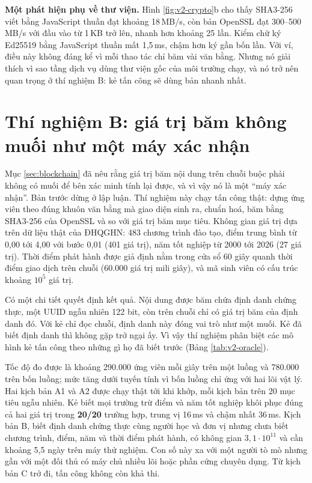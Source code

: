 \textbf{Một phát hiện phụ về thư viện.} Hình \ref{fig:v2-crypto}b cho thấy SHA3-256 viết bằng JavaScript thuần đạt khoảng 18\,MB/s, còn bản OpenSSL đạt 300--500\,MB/s với đầu vào từ 1\,KB trở lên, nhanh hơn khoảng 25 lần. Kiểm chữ ký Ed25519 bằng JavaScript thuần mất 1,5\,ms, chậm hơn ký gần bốn lần. Với ví, điều này không đáng kể vì mỗi thao tác chỉ băm vài văn bằng. Nhưng nó giải thích vì sao tầng dịch vụ dùng thư viện gốc của môi trường chạy, và nó trở nên quan trọng ở thí nghiệm B: kẻ tấn công sẽ dùng bản nhanh nhất.

\section{Thí nghiệm B: giá trị băm không muối như một máy xác nhận}
\label{sec:tn-oracle}

Mục \ref{sec:blockchain} đã nêu rằng giá trị băm nội dung trên chuỗi buộc phải không có muối để bên xác minh tính lại được, và vì vậy nó là một ``máy xác nhận''. Bản trước dừng ở lập luận. Thí nghiệm này chạy tấn công thật: dựng ứng viên theo đúng khuôn văn bằng mà giao diện sinh ra, chuẩn hoá, băm bằng SHA3-256 của OpenSSL và so với giá trị băm mục tiêu. Không gian giá trị dựa trên dữ liệu thật của ĐHQGHN: 483 chương trình đào tạo, điểm trung bình từ 0,00 tới 4,00 với bước 0,01 (401 giá trị), năm tốt nghiệp từ 2000 tới 2026 (27 giá trị). Thời điểm phát hành được giả định nằm trong cửa sổ 60 giây quanh thời điểm giao dịch trên chuỗi (60.000 giá trị mili giây), và mã sinh viên có cấu trúc khoảng $10^5$ giá trị.

Có một chi tiết quyết định kết quả. Nội dung được băm chứa định danh chứng thực, một UUID ngẫu nhiên 122 bit, còn trên chuỗi chỉ có giá trị băm của định danh đó. Với kẻ chỉ đọc chuỗi, định danh này đóng vai trò như một muối. Kẻ đã biết định danh thì không gặp trở ngại ấy. Vì vậy thí nghiệm phân biệt các mô hình kẻ tấn công theo những gì họ đã biết trước (Bảng \ref{tab:v2-oracle}).





Tốc độ đo được là khoảng 290.000 ứng viên mỗi giây trên một luồng và 780.000 trên bốn luồng; mức tăng dưới tuyến tính vì bốn luồng chỉ ứng với hai lõi vật lý. Hai kịch bản A1 và A2 được chạy thật tới khi khớp, mỗi kịch bản trên 20 mục tiêu ngẫu nhiên. Kẻ biết mọi trường trừ điểm và năm tốt nghiệp khôi phục đúng cả hai giá trị trong \textbf{20/20} trường hợp, trung vị 16\,ms và chậm nhất 36\,ms. Kịch bản B, biết định danh chứng thực cùng người học và đơn vị nhưng chưa biết chương trình, điểm, năm và thời điểm phát hành, có không gian $3{,}1 \cdot 10^{11}$ và cần khoảng 5,5 ngày trên máy thử nghiệm. Con số này xa với một người tò mò nhưng gần với một đối thủ có máy chủ nhiều lõi hoặc phần cứng chuyên dụng. Từ kịch bản C trở đi, tấn công không còn khả thi.


